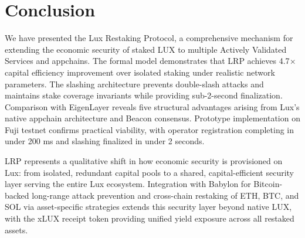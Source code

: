 \section{Conclusion}

\label{sec:conclusion}

We have presented the Lux Restaking Protocol, a comprehensive mechanism for extending
the economic security of staked LUX to multiple Actively Validated Services and appchains.
The formal model demonstrates that LRP achieves 4.7$\times$ capital efficiency improvement
over isolated staking under realistic network parameters. The slashing architecture
prevents double-slash attacks and maintains stake coverage invariants while providing
sub-2-second finalization. Comparison with EigenLayer reveals five structural advantages
arising from Lux's native appchain architecture and Beacon consensus. Prototype
implementation on Fuji testnet confirms practical viability, with operator registration
completing in under 200 ms and slashing finalized in under 2 seconds.

LRP represents a qualitative shift in how economic security is provisioned on Lux: from
isolated, redundant capital pools to a shared, capital-efficient security layer serving
the entire Lux ecosystem. Integration with Babylon for Bitcoin-backed long-range attack
prevention and cross-chain restaking of ETH, BTC, and SOL via asset-specific strategies
extends this security layer beyond native LUX, with the xLUX receipt token providing
unified yield exposure across all restaked assets.

